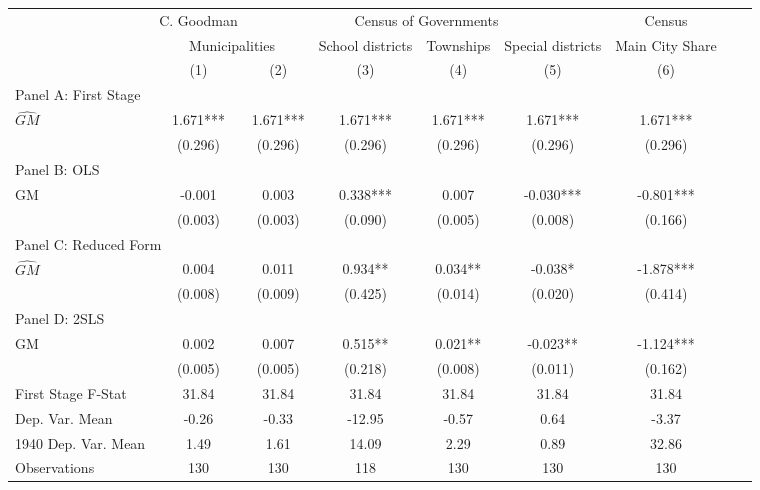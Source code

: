  \begin{tabular}{l*{8}{c}} \toprule
&\multicolumn{1}{c}{C. Goodman}&\multicolumn{4}{c}{Census of Governments}&\multicolumn{1}{c}{Census}\\\cmidrule(lr){2-2}\cmidrule(lr){3-6}\cmidrule(lr){7-7}
&\multicolumn{2}{c}{Municipalities}&\multicolumn{1}{c}{School districts}&\multicolumn{1}{c}{Townships}&\multicolumn{1}{c}{Special districts}&\multicolumn{1}{c}{Main City Share}\\\cmidrule(lr){2-3}\cmidrule(lr){4-6}\cmidrule(lr){7-7}
&\multicolumn{1}{c}{(1)}&\multicolumn{1}{c}{(2)}&\multicolumn{1}{c}{(3)}&\multicolumn{1}{c}{(4)}&\multicolumn{1}{c}{(5)}&\multicolumn{1}{c}{(6)}\\
\cmidrule(lr){1-7}
\multicolumn{6}{l}{Panel A: First Stage}\\
\cmidrule(lr){1-7}
$\widehat{GM}$  &    1.671***&    1.671***&    1.671***&    1.671***&    1.671***&    1.671***\\
                &  (0.296)   &  (0.296)   &  (0.296)   &  (0.296)   &  (0.296)   &  (0.296)   \\
\cmidrule(lr){1-7}
\multicolumn{6}{l}{Panel B: OLS}\\
\cmidrule(lr){1-7}
GM              &   -0.001   &    0.003   &    0.338***&    0.007   &   -0.030***&   -0.801***\\
                &  (0.003)   &  (0.003)   &  (0.090)   &  (0.005)   &  (0.008)   &  (0.166)   \\
\cmidrule(lr){1-7}
\multicolumn{6}{l}{Panel C: Reduced Form}\\
\cmidrule(lr){1-7}
$\widehat{GM}$  &    0.004   &    0.011   &    0.934** &    0.034** &   -0.038*  &   -1.878***\\
                &  (0.008)   &  (0.009)   &  (0.425)   &  (0.014)   &  (0.020)   &  (0.414)   \\
\cmidrule(lr){1-7}
\multicolumn{6}{l}{Panel D: 2SLS}\\
\cmidrule(lr){1-7}
GM              &    0.002   &    0.007   &    0.515** &    0.021** &   -0.023** &   -1.124***\\
                &  (0.005)   &  (0.005)   &  (0.218)   &  (0.008)   &  (0.011)   &  (0.162)   \\
\midrule
First Stage F-Stat&    31.84   &    31.84   &    31.84   &    31.84   &    31.84   &    31.84   \\
Dep. Var. Mean  &    -0.26   &    -0.33   &   -12.95   &    -0.57   &     0.64   &    -3.37   \\
1940 Dep. Var. Mean&     1.49   &     1.61   &    14.09   &     2.29   &     0.89   &    32.86   \\
Observations    &      130   &      130   &      118   &      130   &      130   &      130   \\
 \bottomrule \end{tabular}
